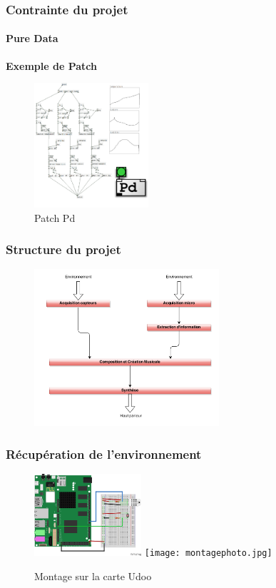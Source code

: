 \documentclass{beamer}
\begin{document}
\begin{frame}
\frametitle{Contrainte du projet}
\framesubtitle{Pure Data}
\textbf{Exemple de Patch}
\begin{figure}
  \centering
  \includegraphics[width=160px]{pd.jpg} 
	\caption{Patch Pd}
\end{figure}

\end{frame}


\begin{frame}
\frametitle{Structure du projet}
\begin{figure}
  \centering
  \includegraphics[height=220px]{structprojet.jpg} 
\end{figure}
\end{frame}


\begin{frame}
\frametitle{Récupération de l'environnement}
\begin{figure}
  \centering
  \includegraphics[width=150px]{montage.jpg}  
  \hspace{15px}
  \texttt{[image: montagephoto.jpg]} 
	\caption{Montage sur la carte Udoo}
\end{figure}
\end{frame}
\end{document}
